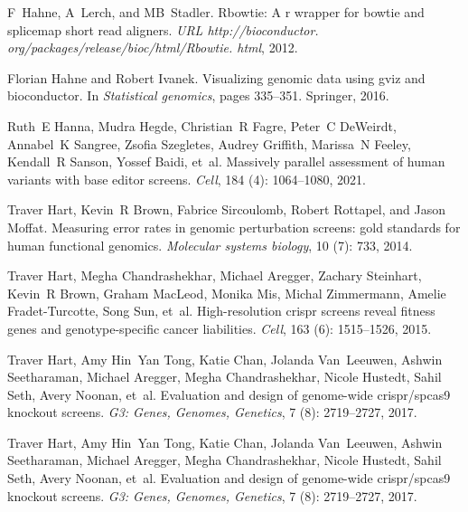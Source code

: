 \documentclass[pdftex,english,10pt]{article}
\begin{document}
{\begin{thebibliography}{105}
F~Hahne, A~Lerch, and MB~Stadler.
\newblock Rbowtie: A r wrapper for bowtie and splicemap short read aligners.
\newblock \emph{URL http://bioconductor.
  org/packages/release/bioc/html/Rbowtie. html}, 2012.

Florian Hahne and Robert Ivanek.
\newblock Visualizing genomic data using gviz and bioconductor.
\newblock In \emph{Statistical genomics}, pages 335--351. Springer, 2016.

Ruth~E Hanna, Mudra Hegde, Christian~R Fagre, Peter~C DeWeirdt, Annabel~K
  Sangree, Zsofia Szegletes, Audrey Griffith, Marissa~N Feeley, Kendall~R
  Sanson, Yossef Baidi, et~al.
\newblock Massively parallel assessment of human variants with base editor
  screens.
\newblock \emph{Cell}, 184 (4): 1064--1080, 2021.

Traver Hart, Kevin~R Brown, Fabrice Sircoulomb, Robert Rottapel, and Jason
  Moffat.
\newblock Measuring error rates in genomic perturbation screens: gold standards
  for human functional genomics.
\newblock \emph{Molecular systems biology}, 10 (7): 733,
  2014.

Traver Hart, Megha Chandrashekhar, Michael Aregger, Zachary Steinhart, Kevin~R
  Brown, Graham MacLeod, Monika Mis, Michal Zimmermann, Amelie Fradet-Turcotte,
  Song Sun, et~al.
\newblock High-resolution crispr screens reveal fitness genes and
  genotype-specific cancer liabilities.
\newblock \emph{Cell}, 163 (6): 1515--1526, 2015.

Traver Hart, Amy Hin~Yan Tong, Katie Chan, Jolanda Van~Leeuwen, Ashwin
  Seetharaman, Michael Aregger, Megha Chandrashekhar, Nicole Hustedt, Sahil
  Seth, Avery Noonan, et~al.
\newblock Evaluation and design of genome-wide crispr/spcas9 knockout screens.
\newblock \emph{G3: Genes, Genomes, Genetics}, 7 (8):
  2719--2727, 2017{}.

Traver Hart, Amy Hin~Yan Tong, Katie Chan, Jolanda Van~Leeuwen, Ashwin
  Seetharaman, Michael Aregger, Megha Chandrashekhar, Nicole Hustedt, Sahil
  Seth, Avery Noonan, et~al.
\newblock Evaluation and design of genome-wide crispr/spcas9 knockout screens.
\newblock \emph{G3: Genes, Genomes, Genetics}, 7 (8):
  2719--2727, 2017{}.


\end{thebibliography}}
\end{document}
